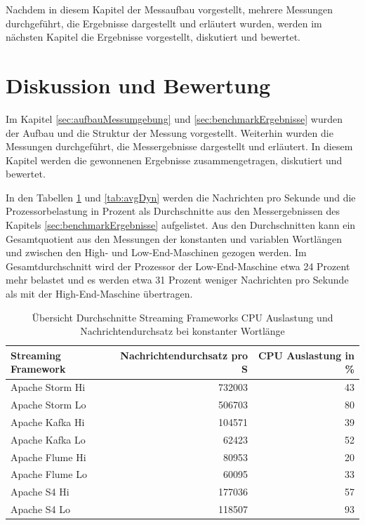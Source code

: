 Nachdem in diesem Kapitel der Messaufbau vorgestellt, mehrere Messungen durchgeführt, die Ergebnisse dargestellt und erläutert wurden, werden im nächsten Kapitel die Ergebnisse vorgestellt, diskutiert und bewertet.


\section{Diskussion und Bewertung}
\label{sec:diskussionUndBewertung}

Im Kapitel \ref{sec:aufbauMessumgebung} und \ref{sec:benchmarkErgebnisse} wurden der Aufbau und die Struktur der Messung vorgestellt. Weiterhin wurden die Messungen durchgeführt, die Messergebnisse dargestellt und erläutert. In diesem Kapitel werden die gewonnenen Ergebnisse zusammengetragen, diskutiert und bewertet.

In den Tabellen \ref{tab:avgSta} und \ref{tab:avgDyn} werden die Nachrichten pro Sekunde und die Prozessorbelastung in Prozent als Durchschnitte aus den Messergebnissen des Kapitels \ref{sec:benchmarkErgebnisse} aufgelistet. Aus den Durchschnitten kann ein Gesamtquotient aus den Messungen der konstanten und variablen Wortlängen und zwischen den High- und Low-End-Maschinen gezogen werden. Im Gesamtdurchschnitt wird der Prozessor der Low-End-Maschine etwa 24 Prozent mehr belastet und es werden etwa 31 Prozent weniger Nachrichten pro Sekunde als mit der High-End-Maschine übertragen.

\begin{table}[!ht]
	\centering
		\begin{tabular}{@{}lrr@{}} \toprule
			\textbf{Streaming Framework} & \textbf{Nachrichtendurchsatz pro S} & \textbf{CPU Auslastung in \%} \\ \midrule
			Apache Storm Hi & 732003 & 43 \\
			Apache Storm Lo & 506703 & 80 \\
			Apache Kafka Hi & 104571 & 39 \\
			Apache Kafka Lo & 62423 & 52 \\
			Apache Flume Hi & 80953 & 20 \\
			Apache Flume Lo & 60095 & 33 \\
			Apache S4 Hi & 177036 & 57 \\
			Apache S4 Lo & 118507 & 93 \\
			\bottomrule			
		\end{tabular}
	\caption{Übersicht Durchschnitte Streaming Frameworks CPU Auslastung und Nachrichtendurchsatz bei konstanter Wortlänge}
	\label{tab:avgSta}
\end{table}

